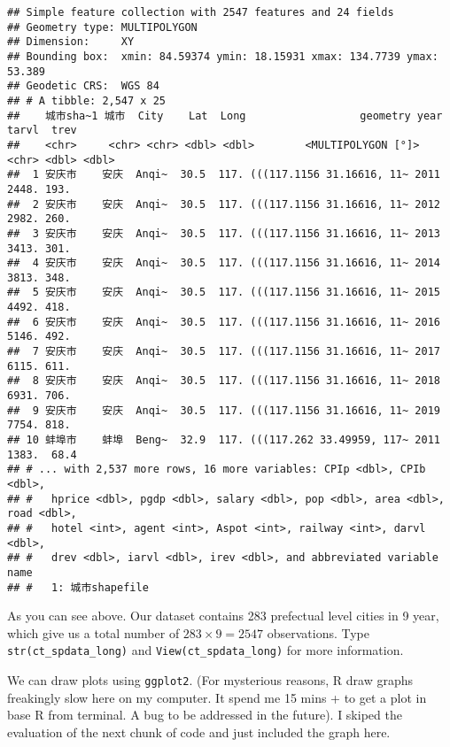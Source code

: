 \documentclass[
]{article}
\begin{document}
\begin{verbatim}
## Simple feature collection with 2547 features and 24 fields
## Geometry type: MULTIPOLYGON
## Dimension:     XY
## Bounding box:  xmin: 84.59374 ymin: 18.15931 xmax: 134.7739 ymax: 53.389
## Geodetic CRS:  WGS 84
## # A tibble: 2,547 x 25
##    城市sha~1 城市  City    Lat  Long                  geometry year  tarvl  trev
##    <chr>     <chr> <chr> <dbl> <dbl>        <MULTIPOLYGON [°]> <chr> <dbl> <dbl>
##  1 安庆市    安庆  Anqi~  30.5  117. (((117.1156 31.16616, 11~ 2011  2448. 193. 
##  2 安庆市    安庆  Anqi~  30.5  117. (((117.1156 31.16616, 11~ 2012  2982. 260. 
##  3 安庆市    安庆  Anqi~  30.5  117. (((117.1156 31.16616, 11~ 2013  3413. 301. 
##  4 安庆市    安庆  Anqi~  30.5  117. (((117.1156 31.16616, 11~ 2014  3813. 348. 
##  5 安庆市    安庆  Anqi~  30.5  117. (((117.1156 31.16616, 11~ 2015  4492. 418. 
##  6 安庆市    安庆  Anqi~  30.5  117. (((117.1156 31.16616, 11~ 2016  5146. 492. 
##  7 安庆市    安庆  Anqi~  30.5  117. (((117.1156 31.16616, 11~ 2017  6115. 611. 
##  8 安庆市    安庆  Anqi~  30.5  117. (((117.1156 31.16616, 11~ 2018  6931. 706. 
##  9 安庆市    安庆  Anqi~  30.5  117. (((117.1156 31.16616, 11~ 2019  7754. 818. 
## 10 蚌埠市    蚌埠  Beng~  32.9  117. (((117.262 33.49959, 117~ 2011  1383.  68.4
## # ... with 2,537 more rows, 16 more variables: CPIp <dbl>, CPIb <dbl>,
## #   hprice <dbl>, pgdp <dbl>, salary <dbl>, pop <dbl>, area <dbl>, road <dbl>,
## #   hotel <int>, agent <int>, Aspot <int>, railway <int>, darvl <dbl>,
## #   drev <dbl>, iarvl <dbl>, irev <dbl>, and abbreviated variable name
## #   1: 城市shapefile
\end{verbatim}

As you can see above. Our dataset contains 283 prefectual level cities
in 9 year, which give us a total number of \(283 \times 9 = 2547\)
observations. Type \texttt{str(ct\_spdata\_long)} and
\texttt{View(ct\_spdata\_long)} for more information.

We can draw plots using \texttt{ggplot2}. (For mysterious reasons, R
draw graphs freakingly slow here on my computer. It spend me 15 mins +
to get a plot in base R from terminal. A bug to be addressed in the
future). I skiped the evaluation of the next chunk of code and just
included the graph here.
\end{document}

